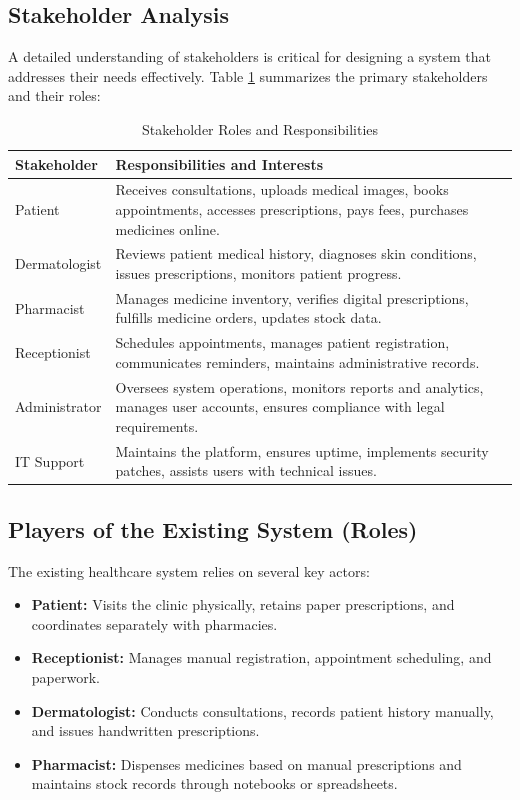 \documentclass[12pt,a4paper]{report}
\begin{document}
\subsection{Stakeholder Analysis}
A detailed understanding of stakeholders is critical for designing a system that addresses their needs effectively. Table \ref{tab:stakeholders} summarizes the primary stakeholders and their roles:

\begin{table}[h]
\centering
\caption{Stakeholder Roles and Responsibilities}
\label{tab:stakeholders}
\begin{tabular}{|l|p{10cm}|}
\hline
\textbf{Stakeholder} & \textbf{Responsibilities and Interests} \\ \hline
Patient & Receives consultations, uploads medical images, books appointments, accesses prescriptions, pays fees, purchases medicines online. \\ \hline
Dermatologist & Reviews patient medical history, diagnoses skin conditions, issues prescriptions, monitors patient progress. \\ \hline
Pharmacist & Manages medicine inventory, verifies digital prescriptions, fulfills medicine orders, updates stock data. \\ \hline
Receptionist & Schedules appointments, manages patient registration, communicates reminders, maintains administrative records. \\ \hline
Administrator & Oversees system operations, monitors reports and analytics, manages user accounts, ensures compliance with legal requirements. \\ \hline
IT Support & Maintains the platform, ensures uptime, implements security patches, assists users with technical issues. \\ \hline
\end{tabular}
\end{table}

\subsection{Players of the Existing System (Roles)}
The existing healthcare system relies on several key actors:

\begin{itemize}
    \item \textbf{Patient:} Visits the clinic physically, retains paper prescriptions, and coordinates separately with pharmacies.
    \item \textbf{Receptionist:} Manages manual registration, appointment scheduling, and paperwork.
    \item \textbf{Dermatologist:} Conducts consultations, records patient history manually, and issues handwritten prescriptions.
    \item \textbf{Pharmacist:} Dispenses medicines based on manual prescriptions and maintains stock records through notebooks or spreadsheets.
\end{itemize}
\end{document}
